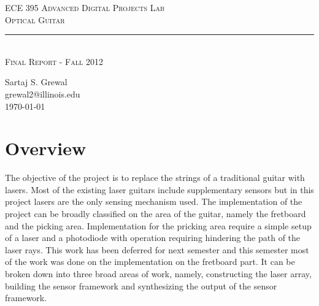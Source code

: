 \documentclass[11pt]{article}
\begin{document}
\begin{titlepage}
\begin{center}
{\LARGE \textsc{ECE 395 Advanced Digital Projects Lab} \\ \vspace{8pt}}
{\Large \textsc{Optical Guitar} \\ \vspace{8pt}} 
\rule[13pt]{\textwidth}{1pt} \\ \vspace{150pt}
{\Large \textsc{Final Report - Fall 2012 } \\ \vspace{8pt}}

{\large Sartaj S. Grewal\\ \vspace{1pt}
\large grewal2@illinois.edu\\ \vspace{16pt}
 \today}
\vfill
\end{center}

\end{titlepage}
\setcounter{page}{2}

\newpage{}

\tableofcontents

\newpage{}


\section{Overview}

{The objective of the project is to replace the strings of a traditional guitar with lasers. Most of the existing laser guitars include supplementary sensors but in this project lasers are the only sensing mechanism used. The implementation of the project can be broadly classified on the area of the guitar, namely the fretboard and the picking area. Implementation for the pricking area require a simple setup of a laser and a photodiode with operation requiring hindering the path of the laser rays. This work has been deferred for next semester and this semester most of the work was done on the implementation on the fretboard part. It can be broken down into three broad areas of work, namely,  constructing the laser array, building the sensor framework and synthesizing the output of the sensor framework. }
\end{document}
